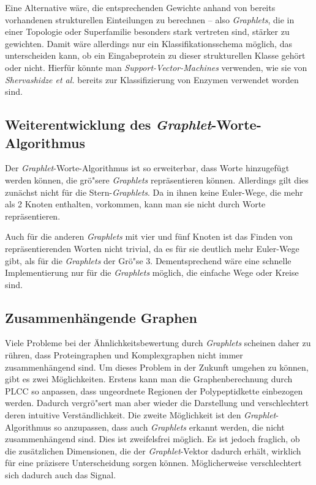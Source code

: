 \documentclass{report}
\begin{document}
Eine Alternative w\"are, die entsprechenden Gewichte anhand von bereits vorhandenen strukturellen Einteilungen zu berechnen -- also \textit{Graphlets}, die in einer Topologie oder Superfamilie besonders stark vertreten sind, st\"arker zu gewichten. Damit w\"are allerdings nur ein Klassifikationsschema m\"oglich, das unterscheiden kann, ob ein Eingabeprotein zu dieser strukturellen Klasse geh\"ort oder nicht. Hierf\"ur k\"onnte man \textit{Support-Vector-Machines} verwenden, wie sie von \textit{Shervashidze et al.} \cite{sherv_graphlets} bereits zur Klassifizierung von Enzymen verwendet worden sind. 

\subsection{Weiterentwicklung des \textit{Graphlet}-Worte-Algorithmus}

Der \textit{Graphlet}-Worte-Algorithmus ist so erweiterbar, dass Worte hinzugef\"ugt werden k\"onnen, die gr\"o"sere \textit{Graphlets} repr\"asentieren k\"onnen. Allerdings gilt dies zun\"achst nicht f\"ur die Stern-\textit{Graphlets}. Da in ihnen keine Euler-Wege, die mehr als 2 Knoten enthalten, vorkommen, kann man sie nicht durch Worte repr\"asentieren.


Auch f\"ur die anderen \textit{Graphlets} mit vier und f\"unf Knoten ist das Finden von repr\"asentierenden Worten nicht trivial, da es f\"ur sie deutlich mehr Euler-Wege gibt, als f\"ur die \textit{Graphlets} der Gr\"o"se 3.
Dementsprechend w\"are eine schnelle Implementierung nur f\"ur die \textit{Graphlets} m\"oglich, die einfache Wege oder Kreise sind.

\subsection{Zusammenh\"angende Graphen}

Viele Probleme bei der \"Ahnlichkeitsbewertung durch \textit{Graphlets} scheinen daher zu r\"uhren, dass Proteingraphen und Komplexgraphen nicht immer zusammenh\"angend sind.
Um dieses Problem in der Zukunft umgehen zu k\"onnen, gibt es zwei M\"oglichkeiten.
Erstens kann man die Graphenberechnung durch PLCC so anpassen, dass ungeordnete Regionen der Polypeptidkette einbezogen werden. Dadurch vergr\"o"sert man aber wieder die Darstellung und verschlechtert deren intuitive Verst\"andlichkeit.
Die zweite M\"oglichkeit ist den \textit{Graphlet}-Algorithmus so anzupassen, dass auch \textit{Graphlets} erkannt werden, die nicht zusammenh\"angend sind. Dies ist zweifelsfrei m\"oglich. Es ist jedoch fraglich, ob die zus\"atzlichen Dimensionen, die der \textit{Graphlet}-Vektor dadurch erh\"alt, wirklich f\"ur eine pr\"azisere Unterscheidung sorgen k\"onnen. M\"oglicherweise verschlechtert sich dadurch auch das Signal. 
\end{document}
